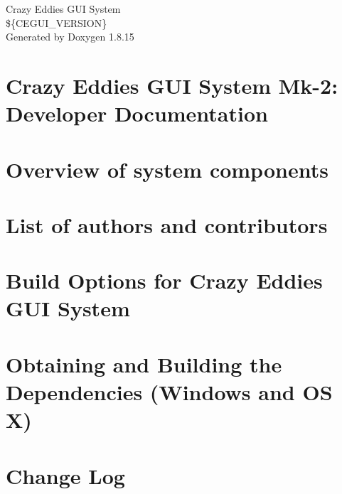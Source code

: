 \let\mypdfximage\pdfximage\def\pdfximage{\immediate\mypdfximage}\documentclass[twoside]{book}
\newcommand{\+}{\discretionary{\mbox{\scriptsize$\hookleftarrow$}}{}{}}
\newcommand{\clearemptydoublepage}{%
  \newpage{\pagestyle{empty}\cleardoublepage}%
}
\begin{document}
\hypersetup{pageanchor=false,
             bookmarksnumbered=true,
             pdfencoding=unicode
            }
\begin{titlepage}
\vspace*{7cm}
\begin{center}%
{\Large Crazy Eddie\textquotesingle{}s G\+UI System \\[1ex]\large \$\{C\+E\+G\+U\+I\+\_\+\+V\+E\+R\+S\+I\+ON\} }\\
\vspace*{1cm}
{\large Generated by Doxygen 1.8.15}\\
\end{center}
\end{titlepage}
\clearemptydoublepage
{}
\tableofcontents
\clearemptydoublepage
{}
\hypersetup{pageanchor=true}

\chapter{Crazy Eddie\textquotesingle{}s G\+UI System Mk-\/2\+: Developer Documentation}
\label{index}\hypertarget{index}{}
\chapter{Overview of system components}
\label{arch_overview}

\chapter{List of authors and contributors}
\label{authors}

\chapter{Build Options for Crazy Eddie\textquotesingle{}s G\+UI System}
\label{build_options}

\chapter{Obtaining and Building the Dependencies (Windows and OS X)}
\label{building_deps}

\chapter{Change Log}
\label{change_log}

\end{document}
